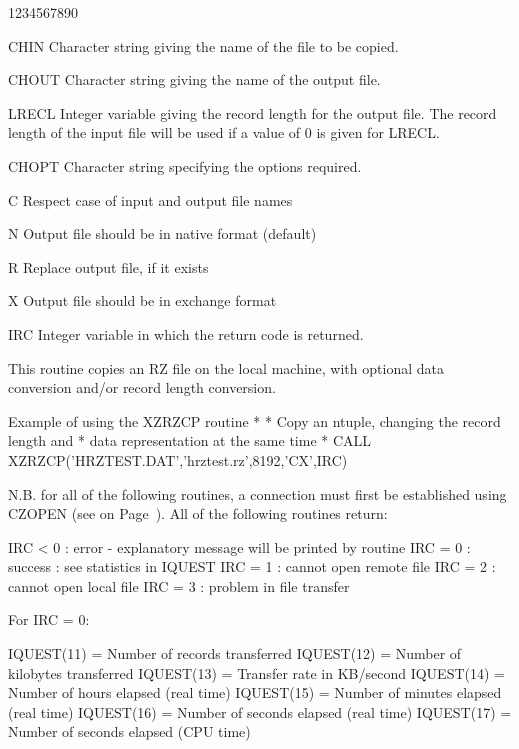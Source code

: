 \begin{DLtt}{1234567890}
\item[CHIN]Character string giving the name of the file
to be copied.
\item[CHOUT]Character string giving the name of the output
file.
\item[LRECL]Integer variable giving the record length for
the output file. The record length of the input file will
be used if a value of 0 is given for LRECL.
\item[CHOPT]Character string specifying the options required.
\begin{DLtt}{12}
\item[C]Respect case of input and output file names
\item[N]Output file should be in native format (default)
\item[R]Replace output file, if it exists
\item[X]Output file should be in exchange format
\end{DLtt}
\item[IRC]Integer variable in which the return code is returned.
\end{DLtt}
This routine copies an RZ file on the local machine, with
optional data conversion and/or record length conversion.
\begin{XMPt}{Example of using the XZRZCP routine}
*
*     Copy an ntuple, changing the record length and
*     data representation at the same time
*
      CALL XZRZCP('HRZTEST.DAT','hrztest.rz',8192,'CX',IRC)
\end{XMPt}
\par
N.B. for all of the following routines, a connection must
first be established using CZOPEN (see on Page~\pageref{CZOPEN}).
All of the following routines return:
\begin{XMP}
IRC < 0 : error - explanatory message will be printed by routine
IRC = 0 : success : see statistics in IQUEST
IRC = 1 : cannot open remote file
IRC = 2 : cannot open local  file
IRC = 3 : problem in file transfer

For IRC = 0:

IQUEST(11) = Number of records transferred
IQUEST(12) = Number of kilobytes transferred
IQUEST(13) = Transfer rate in KB/second
IQUEST(14) = Number of hours elapsed (real time)
IQUEST(15) = Number of minutes elapsed (real time)
IQUEST(16) = Number of seconds elapsed (real time)
IQUEST(17) = Number of seconds elapsed (CPU time)
\end{XMP}

